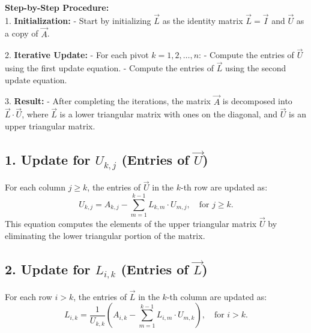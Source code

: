 \documentclass[journal]{IEEEtran}
\begin{document}
\textbf{Step-by-Step Procedure:}\\
1. \textbf{Initialization:}  
   - Start by initializing $\vec{L}$ as the identity matrix $\vec{L} = \vec{I}$ and $\vec{U}$ as a copy of $\vec{A}$.

2. \textbf{Iterative Update:}  
   - For each pivot $k = 1, 2, \ldots, n$:  
     - Compute the entries of $\vec{U}$ using the first update equation.  
     - Compute the entries of $\vec{L}$ using the second update equation.  

3. \textbf{Result:}  
   - After completing the iterations, the matrix $\vec{A}$ is decomposed into $\vec{L} \cdot \vec{U}$, where $\vec{L}$ is a lower triangular matrix with ones on the diagonal, and $\vec{U}$ is an upper triangular matrix.

\subsection*{1. Update for $U_{k,j}$ (Entries of $\vec{U}$)}
For each column $j \geq k$, the entries of $\vec{U}$ in the $k$-th row are updated as:
\[
U_{k,j} = A_{k,j} - \sum_{m=1}^{k-1} L_{k,m} \cdot U_{m,j}, \quad \text{for } j \geq k.
\]
This equation computes the elements of the upper triangular matrix $\vec{U}$ by eliminating the lower triangular portion of the matrix.

\subsection*{2. Update for $L_{i,k}$ (Entries of $\vec{L}$)}
For each row $i > k$, the entries of $\vec{L}$ in the $k$-th column are updated as:
\[
L_{i,k} = \frac{1}{U_{k,k}} \left( A_{i,k} - \sum_{m=1}^{k-1} L_{i,m} \cdot U_{m,k} \right), \quad \text{for } i > k.
\]
\end{document}
